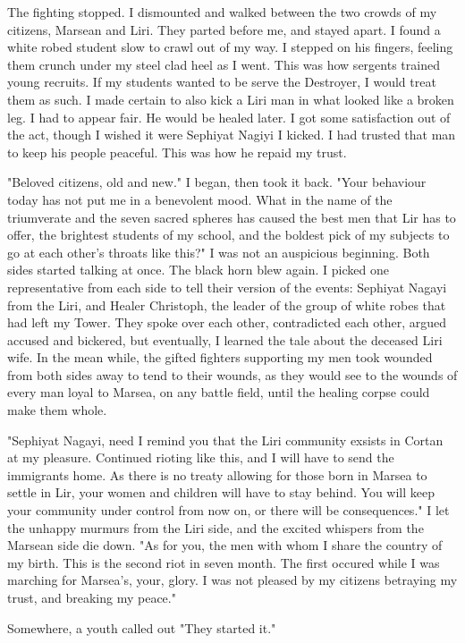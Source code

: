 \documentclass{article}
\begin{document}
The fighting stopped. I dismounted and walked between the two crowds of my citizens, Marsean and Liri. They parted before me, and stayed apart. I found a white robed student slow to crawl out of my way. I stepped on his fingers, feeling them crunch under my steel clad heel as I went. This was how sergents trained young recruits. If my students wanted to be serve the Destroyer, I would treat them as such. I made certain to also kick a Liri man in what looked like a broken leg. I had to appear fair. He would be healed later. I got some satisfaction out of the act, though I wished it were Sephiyat Nagiyi I kicked. I had trusted that man to keep his people peaceful. This was how he repaid my trust.

"Beloved citizens, old and new." I began, then took it back. "Your behaviour today has not put me in a benevolent mood. What in the name of the triumverate and the seven sacred spheres has caused the best men that Lir has to offer, the brightest students of my school, and the boldest pick of my subjects to go at each other's throats like this?" I was not an auspicious beginning. Both sides started talking at once. The black horn blew again. I picked one representative from each side to tell their version of the events: Sephiyat Nagayi from the Liri, and Healer Christoph, the leader of the group of white robes that had left my Tower. They spoke over each other, contradicted each other, argued accused and bickered, but eventually, I learned the tale about the deceased Liri wife. In the mean while, the gifted fighters supporting my men took wounded from both sides away to tend to their wounds, as they would see to the wounds of every man loyal to Marsea, on any battle field, until the healing corpse could make them whole.

"Sephiyat Nagayi, need I remind you that the Liri community exsists in Cortan at my pleasure. Continued rioting like this, and I will have to send the immigrants home. As there is no treaty allowing for those born in Marsea to settle in Lir, your women and children will have to stay behind. You will keep your community under control from now on, or there will be consequences." I let the unhappy murmurs from the Liri side, and the excited whispers from the Marsean side die down. "As for you, the men with whom I share the country of my birth. This is the second riot in seven month. The first occured while I was marching for Marsea's, your, glory. I was not pleased by my citizens betraying my trust, and breaking my peace." 

Somewhere, a youth called out "They started it."
\end{document}
